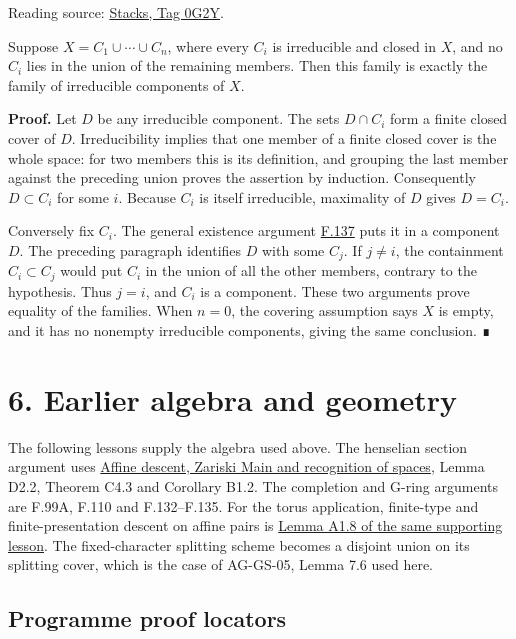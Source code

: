 \documentclass[11pt,a4paper,openany]{report}
\newcounter{none}
\begin{document}
Reading source: \href{https://stacks.math.columbia.edu/tag/0G2Y}{Stacks, Tag 0G2Y}.

Suppose \(X=C_1\cup\cdots\cup C_n\), where every \(C_i\) is irreducible and closed in \(X\), and no \(C_i\) lies in the union of the remaining members. Then this family is exactly the family of irreducible components of \(X\).

\textbf{Proof.} Let \(D\) be any irreducible component. The sets \(D\cap C_i\) form a finite closed cover of \(D\). Irreducibility implies that one member of a finite closed cover is the whole space: for two members this is its definition, and grouping the last member against the preceding union proves the assertion by induction. Consequently \(D\subset C_i\) for some \(i\). Because \(C_i\) is itself irreducible, maximality of \(D\) gives \(D=C_i\).

Conversely fix \(C_i\). The general existence argument \hyperref[AG-RG-S05-topology-lemma-irreducible]{F.137} puts it in a component \(D\). The preceding paragraph identifies \(D\) with some \(C_j\). If \(j\ne i\), the containment \(C_i\subset C_j\) would put \(C_i\) in the union of all the other members, contrary to the hypothesis. Thus \(j=i\), and \(C_i\) is a component. These two arguments prove equality of the families. When \(n=0\), the covering assumption says \(X\) is empty, and it has no nonempty irreducible components, giving the same conclusion. ∎

\section{6. Earlier algebra and geometry}\label{AG-RG-S05-earlier-algebra-and-geometry}

The following lessons supply the algebra used above. The henselian section argument uses \href{https://github.com/KokunoYumeto/open-math-courses/blob/main/docs/courses/AG-RG/AG-RG-S04.md}{Affine descent, Zariski Main and recognition of spaces}, Lemma D2.2, Theorem C4.3 and Corollary B1.2. The completion and G-ring arguments are F.99A, F.110 and F.132--F.135. For the torus application, finite-type and finite-presentation descent on affine pairs is \href{https://github.com/KokunoYumeto/open-math-courses/blob/main/docs/courses/AG-RG/AG-RG-S04.md\#affine-presentation-communication}{Lemma A1.8 of the same supporting lesson}. The fixed-character splitting scheme becomes a disjoint union on its splitting cover, which is the case of AG-GS-05, Lemma 7.6 used here.

\subsection{Programme proof locators}\label{AG-RG-S05-programme-proof-locators}
\end{document}
